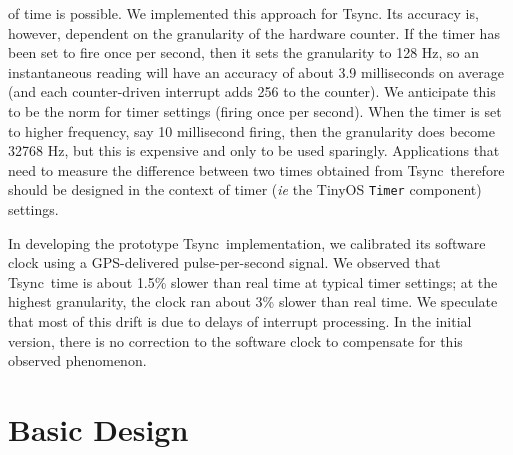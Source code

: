 \documentclass[11pt]{article}
\def\Tsync{\textsf{Tsync}}
\begin{document}
of time is possible.  We implemented this approach for \Tsync.  Its
accuracy is, however, dependent on the granularity of the hardware
counter.  If the timer has been set to fire once per second, then
it sets the granularity to 128 Hz, so an instantaneous reading will
have an accuracy of about 3.9 milliseconds on average (and each 
counter-driven interrupt adds 256 to the counter).  We anticipate this
to be the norm for timer settings (firing once per second).  When
the timer is set to higher frequency, say 10 millisecond firing, then
the granularity does become 32768 Hz, but this is expensive and only
to be used sparingly.  Applications that need to measure the difference
between two times obtained from \Tsync\ therefore should be designed
in the context of timer (\emph{ie} the TinyOS \texttt{Timer} component)
settings.
\par
In developing the prototype \Tsync\ implementation, we calibrated
its software clock using a GPS-delivered pulse-per-second signal.
We observed that \Tsync\ time is about 1.5\% slower than real time
at typical timer settings;  at the highest granularity, the clock
ran about 3\% slower than real time.  We speculate that most of
this drift is due to delays of interrupt processing.  In the initial 
version, there is no correction to the software clock to compensate
for this observed phenomenon.

\section{Basic Design}
\end{document}
